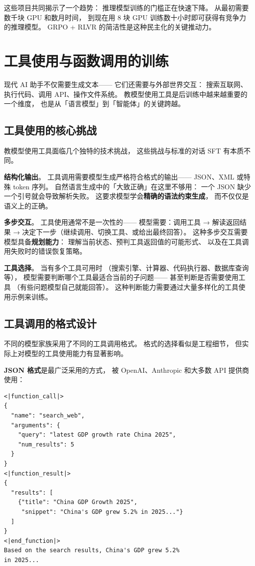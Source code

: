 这些项目共同揭示了一个趋势：
推理模型训练的门槛正在快速下降。
从最初需要数千块 GPU 和数月时间，
到现在用 8 块 GPU 训练数十小时即可获得有竞争力的推理模型。
GRPO + RLVR 的简洁性是这种民主化的关键推动力。

\section{工具使用与函数调用的训练}
\label{sec:tool-use-training}

现代 AI 助手不仅需要生成文本——
它们还需要与外部世界交互：
搜索互联网、执行代码、调用 API、操作文件系统。
教模型使用工具是后训练中越来越重要的一个维度，
也是从「语言模型」到「智能体」的关键跨越。

\subsection{工具使用的核心挑战}

教模型使用工具面临几个独特的技术挑战，
这些挑战与标准的对话 SFT 有本质不同。

\textbf{结构化输出}。
工具调用需要模型生成严格符合格式的输出——
JSON、XML 或特殊 token 序列。
自然语言生成中的「大致正确」在这里不够用：
一个 JSON 缺少一个引号就会导致解析失败。
这要求模型学会\textbf{精确的语法约束生成}，
而不仅仅是语义上的正确。

\textbf{多步交互}。
工具使用通常不是一次性的——
模型需要：调用工具 → 解读返回结果 →
决定下一步（继续调用、切换工具、或给出最终回答）。
这种多步交互需要模型具备\textbf{规划能力}：
理解当前状态、预判工具返回值的可能形式、
以及在工具调用失败时的错误恢复策略。

\textbf{工具选择}。
当有多个工具可用时
（搜索引擎、计算器、代码执行器、数据库查询等），
模型需要判断哪个工具最适合当前的子问题——
甚至判断是否需要使用工具
（有些问题模型自己就能回答）。
这种判断能力需要通过大量多样化的工具使用示例来训练。

\subsection{工具调用的格式设计}

不同的模型家族采用了不同的工具调用格式。
格式的选择看似是工程细节，
但实际上对模型的工具使用能力有显著影响。

\textbf{JSON 格式}是最广泛采用的方式，
被 OpenAI、Anthropic 和大多数 API 提供商使用：

\begin{lstlisting}[caption={JSON-based function calling format}]
<|function_call|>
{
  "name": "search_web",
  "arguments": {
    "query": "latest GDP growth rate China 2025",
    "num_results": 5
  }
}
<|function_result|>
{
  "results": [
    {"title": "China GDP Growth 2025",
     "snippet": "China's GDP grew 5.2% in 2025..."}
  ]
}
<|end_function|>
Based on the search results, China's GDP grew 5.2%
in 2025...
\end{lstlisting}

